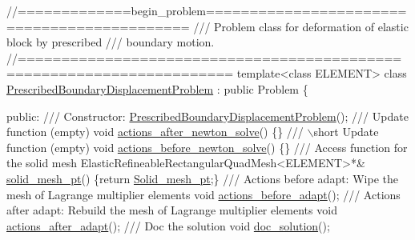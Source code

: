  
\begin{DoxyCodeInclude}
\textcolor{comment}{//=============begin\_problem============================================ }
\textcolor{comment}{/// Problem class for deformation of elastic block by prescribed}
\textcolor{comment}{}\textcolor{comment}{/// boundary motion.}
\textcolor{comment}{}\textcolor{comment}{//====================================================================== }
\textcolor{keyword}{template}<\textcolor{keyword}{class} ELEMENT>
\textcolor{keyword}{class }\hyperlink{classPrescribedBoundaryDisplacementProblem}{PrescribedBoundaryDisplacementProblem} : \textcolor{keyword}{public} Problem
\{

\textcolor{keyword}{public}:
\textcolor{comment}{}
\textcolor{comment}{ /// Constructor:}
\textcolor{comment}{} \hyperlink{classPrescribedBoundaryDisplacementProblem_ac0c8b47eeb75ba2c618757e6b56e62dc}{PrescribedBoundaryDisplacementProblem}();
 \textcolor{comment}{}
\textcolor{comment}{ /// Update function (empty)}
\textcolor{comment}{} \textcolor{keywordtype}{void} \hyperlink{classPrescribedBoundaryDisplacementProblem_a53e7d18d9d748388160d6c4106f1d493}{actions\_after\_newton\_solve}() \{\}
\textcolor{comment}{}
\textcolor{comment}{ /// \(\backslash\)short Update function (empty)}
\textcolor{comment}{} \textcolor{keywordtype}{void} \hyperlink{classPrescribedBoundaryDisplacementProblem_ad2184bb8d7391da21bec62d4aacf5c20}{actions\_before\_newton\_solve}() \{\}
\textcolor{comment}{}
\textcolor{comment}{ /// Access function for the solid mesh}
\textcolor{comment}{} ElasticRefineableRectangularQuadMesh<ELEMENT>*& \hyperlink{classPrescribedBoundaryDisplacementProblem_ac0fc3028f61cec5ac4b01670d7728934}{solid\_mesh\_pt}() 
  \{\textcolor{keywordflow}{return} \hyperlink{classPrescribedBoundaryDisplacementProblem_a6d2cdbd9ae1077c80831d938bdb72a61}{Solid\_mesh\_pt};\} 
\textcolor{comment}{}
\textcolor{comment}{ /// Actions before adapt: Wipe the mesh of Lagrange multiplier elements}
\textcolor{comment}{} \textcolor{keywordtype}{void} \hyperlink{classPrescribedBoundaryDisplacementProblem_a2e9f335e8680b0f2338b579e37e9d38a}{actions\_before\_adapt}();
\textcolor{comment}{}
\textcolor{comment}{ /// Actions after adapt: Rebuild the mesh of Lagrange multiplier elements}
\textcolor{comment}{} \textcolor{keywordtype}{void} \hyperlink{classPrescribedBoundaryDisplacementProblem_aae7225db18ad5c8429c0eb96fa37b585}{actions\_after\_adapt}();
\textcolor{comment}{}
\textcolor{comment}{ /// Doc the solution}
\textcolor{comment}{} \textcolor{keywordtype}{void} \hyperlink{classPrescribedBoundaryDisplacementProblem_abc58821d6b49cd9773dcd90b240aab6e}{doc\_solution}();


\end{DoxyCodeInclude}

